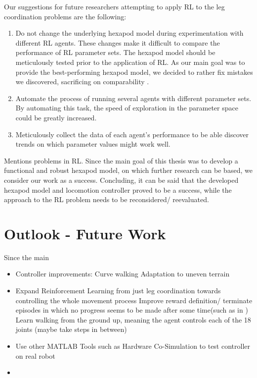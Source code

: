 Our suggestions for future researchers attempting to apply RL to the leg coordination problems are the following:
\begin{enumerate}
	\item Do not change the underlying hexapod model during experimentation with different RL agents. 
	These changes make it difficult to compare the performance of RL parameter sets.
	The hexapod model should be meticulously tested prior to the application of RL.
	As our main goal was to provide the best-performing hexapod model, we decided to rather fix mistakes we discovered, sacrificing on comparability .
	
	\item Automate the process of running several agents with different parameter sets. 
	By automating this task, the speed of exploration in the parameter space could be greatly increased.
	
	\item Meticulously collect the data of each agent's performance to be able discover trends on which parameter values might work well.
	
\end{enumerate}

Mentions problems in RL.
Since the main goal of this thesis was to develop a functional and robust hexapod model, on which further research can be based, we consider our work as a success.
Concluding, it can be said that the developed hexapod model and locomotion controller proved to be a success, while the approach to the RL problem needs to be reconsidered/ reevaluated.


\section{Outlook - Future Work}

Since the main 

\begin{itemize}
	
	\item Controller improvements:
		\subitem Curve walking
		\subitem Adaptation to uneven terrain
		\subitem 
	
	\item Expand Reinforcement Learning from just leg coordination towards controlling the whole movement process
		\subitem Improve reward definition/ terminate episodes in which no progress seems to be made after some time(such as in \cite{lillicrap2015continuous})
		\subitem Learn walking from the ground up, meaning the agent controls each of the 18 joints (maybe take steps in between)
		\subitem
	
	\item Use other MATLAB Tools such as Hardware Co-Simulation to test controller on real robot
	
	\item 
	
\end{itemize}